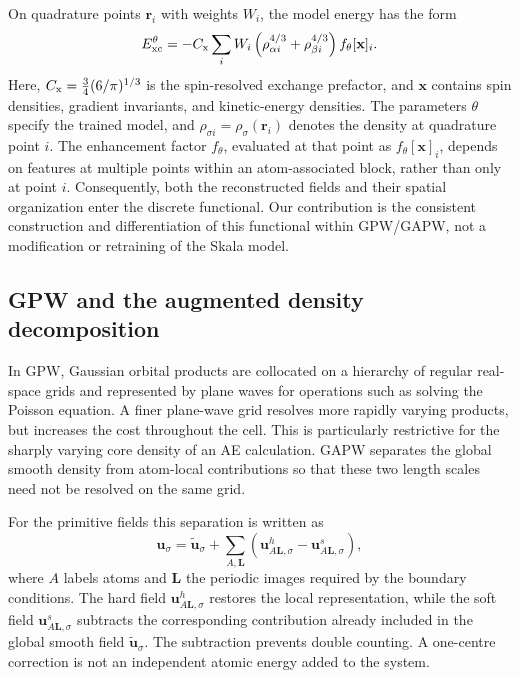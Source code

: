 \documentclass[10pt,a4paper,twocolumn]{article}
\newcommand{\uvec}{\boldsymbol{u}}
\begin{document}
On quadrature points $\mathbf r_i$ with weights $W_i$, the model energy has the form\cite{Skala2025}
\begin{equation}
 E_{\rm xc}^{\theta}=-C_{\rm x}\sum_i W_i
 \left(\rho_{\alpha i}^{4/3}+\rho_{\beta i}^{4/3}\right)
 f_{\theta}[\mathbf x]_i.
 \label{eq:skala-energy}
\end{equation}
Here, $C_{\rm x}=\tfrac34(6/\pi)^{1/3}$ is the spin-resolved exchange prefactor, and $\mathbf x$ contains spin densities, gradient invariants, and kinetic-energy densities. The parameters $\theta$ specify the trained model, and $\rho_{\sigma i}=\rho_\sigma(\mathbf r_i)$ denotes the density at quadrature point $i$. The enhancement factor $f_\theta$, evaluated at that point as $f_\theta[\mathbf x]_i$, depends on features at multiple points within an atom-associated block, rather than only at point $i$. Consequently, both the reconstructed fields and their spatial organization enter the discrete functional. Our contribution is the consistent construction and differentiation of this functional within GPW/GAPW, not a modification or retraining of the Skala model.

\subsection{GPW and the augmented density decomposition}

In GPW, Gaussian orbital products are collocated on a hierarchy of regular real-space grids and represented by plane waves for operations such as solving the Poisson equation.\cite{Lippert1997} A finer plane-wave grid resolves more rapidly varying products, but increases the cost throughout the cell. This is particularly restrictive for the sharply varying core density of an AE calculation. GAPW separates the global smooth density from atom-local contributions so that these two length scales need not be resolved on the same grid.\cite{Lippert1999}

For the primitive fields this separation is written as
\begin{equation}
 \uvec_\sigma=\widetilde{\uvec}_\sigma+
 \sum_{A,\mathbf L}\left(\uvec^h_{A\mathbf L,\sigma}
                  -\uvec^s_{A\mathbf L,\sigma}\right),
 \label{eq:reconstruct}
\end{equation}
where $A$ labels atoms and $\mathbf L$ the periodic images required by the boundary conditions. The hard field $\uvec^h_{A\mathbf L,\sigma}$ restores the local representation, while the soft field $\uvec^s_{A\mathbf L,\sigma}$ subtracts the corresponding contribution already included in the global smooth field $\widetilde{\uvec}_\sigma$. The subtraction prevents double counting. A one-centre correction is not an independent atomic energy added to the system.
\end{document}
